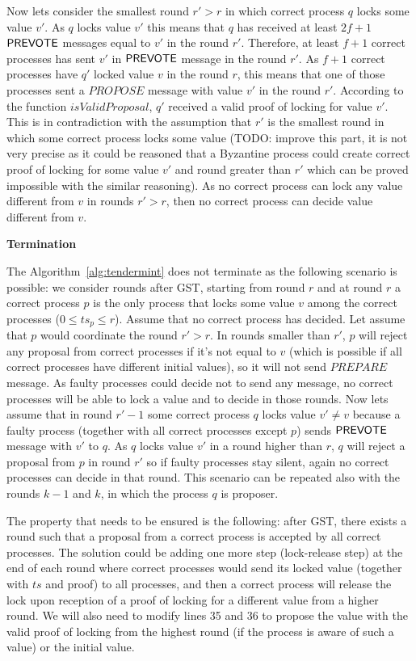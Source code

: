 Now lets consider the smallest round $r' > r$ in which correct process $q$ locks some value $v'$. As $q$ locks value $v'$ this means that $q$ has received at least $2f+1$ $\mathsf{PREVOTE}$ messages equal to $v'$ in the round $r'$. Therefore, at least $f+1$ correct processes has sent $v'$ in $\mathsf{PREVOTE}$ message in the round $r'$. As $f+1$ correct processes have $q'$ locked value $v$ in the round $r$, this means that one of those processes sent a $PROPOSE$ message with value $v'$ in the round $r'$. According to the function $isValidProposal$, $q'$ received a valid proof of locking for value $v'$. This is in contradiction with the assumption that $r'$ is the smallest round in which some correct process locks some value (TODO: improve this part, it is not very precise as it could be reasoned that a Byzantine process could create correct proof of locking for some value $v'$ and round greater than $r'$ which can be proved impossible with the similar reasoning). As no correct process can lock any value different from $v$ in rounds $r' > r$, then no correct process can decide value different from $v$. 

\textbf{Termination} 

The Algorithm~\ref{alg:tendermint} does not terminate as the following scenario is possible: we consider rounds after GST, starting from round $r$ and at round $r$ a correct process $p$ is the only process that locks some value $v$ among the correct processes ($0 \le ts_p \le r$). Assume that no correct process has decided. Let assume that $p$ would coordinate the round $r'>r$. In rounds smaller than $r'$, $p$ will reject any proposal from correct processes if it's not equal to $v$ (which is possible if all correct processes have different initial values), so it will not send $PREPARE$ message. As faulty processes could decide not to send any message, no correct processes will be able to lock a value and to decide in those rounds. Now lets assume that in round $r'-1$ some correct process $q$ locks value $v' \neq v$ because a faulty process (together with all correct processes except $p$) sends $\mathsf{PREVOTE}$ message with $v'$ to $q$. As $q$ locks value $v'$ in a round higher than $r$, $q$ will reject a proposal from $p$ in round $r'$ so if faulty processes stay silent, again no correct processes can decide in that round. This scenario can be repeated also with the rounds $k-1$ and $k$, in which the process $q$ is proposer.

The property that needs to be ensured is the following: after GST, there exists a round such that a proposal from a correct process is accepted by all correct processes. The solution could be adding one more step (lock-release step) at the end of each round where correct processes would send its locked value (together with $ts$ and proof) to all processes, and then a correct process will release the lock upon reception of a proof of locking for a different value from a higher round. We will also need to modify lines 35 and 36 to propose the value with the valid proof of locking from the highest round (if the process is aware of such a value) or the initial value.

            


